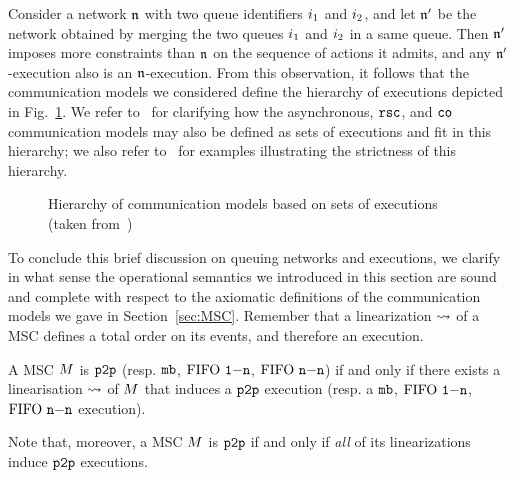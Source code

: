 Consider a network $\mathfrak{n}$ with two queue identifiers $i_1$ and $i_2$,
and let $\mathfrak{n}'$ be the network obtained by merging the two queues $i_1$ and $i_2$ in a
same queue. Then $\mathfrak{n}'$ imposes more constraints than $\mathfrak{n}$ on the sequence of actions it admits,
and any $\mathfrak{n}'$-execution also is an $\mathfrak{n}$-execution. From this observation, it follows that
the communication models we considered define the hierarchy of executions depicted in
Fig.~\ref{fig:hierarchy-of-executions}. We refer
to~\cite{DBLP:journals/fac/ChevrouHQ16}
for clarifying how the asynchronous, $\mathtt{rsc}$, and $\mathtt{co}$ communication models may
also be defined as sets of executions and fit in this hierarchy; we also refer
to~\cite{DBLP:journals/fac/ChevrouHQ16} for examples illustrating
the strictness of this hierarchy.

\begin{figure}
    
    \caption{\label{fig:hierarchy-of-executions} Hierarchy of communication models based on  sets of
    executions (taken from~\cite{DBLP:journals/fac/ChevrouHQ16})}
\end{figure}

To conclude this brief discussion on queuing networks and executions, we clarify in what sense the operational semantics we introduced in this section are sound and complete with respect to the axiomatic definitions of the communication models we gave in Section~\ref{sec:MSC}. Remember that a linearization $\rightsquigarrow$ of a MSC
defines a total order on its events, and therefore an execution.

\begin{fact}
A MSC $M$ is $\mathtt{p2p}$ (resp. $\mathtt{mb}$, $\text{FIFO } \mathtt{1\mathsf{-}n}$, $\text{FIFO } \mathtt{n\mathsf{-}n}$) if and only if there exists
a linearisation $\rightsquigarrow$ of $M$ that induces a $\mathtt{p2p}$ execution (resp. a $\mathtt{mb}$, $\text{FIFO } \mathtt{1\mathsf{-}n}$, $\text{FIFO } \mathtt{n\mathsf{-}n}$ execution).
\end{fact}

Note that, moreover, a MSC $M$ is $\mathtt{p2p}$ if and only if \emph{all} of its linearizations induce $\mathtt{p2p}$ executions.